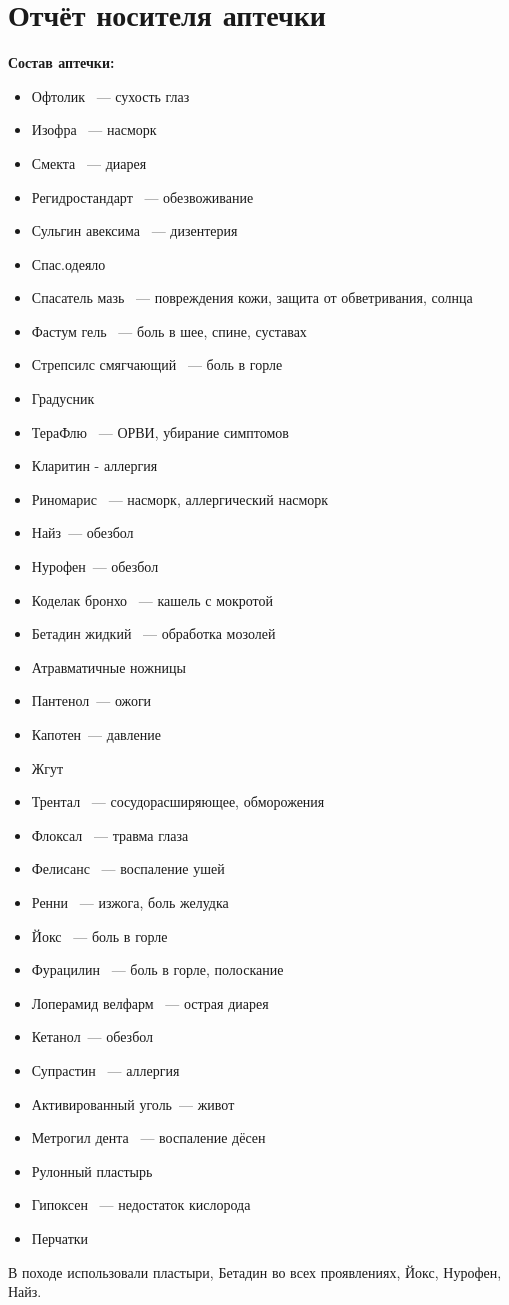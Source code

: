 \section{Отчёт носителя аптечки}

\textbf{Состав аптечки:}

\begin{itemize}
	\item Офтолик ~--- сухость глаз
	\item Изофра ~--- насморк
	\item Смекта ~---  диарея
	\item Регидростандарт ~--- обезвоживание
	\item Сульгин авексима ~--- дизентерия	
	\item Спас.одеяло
	\item Спасатель мазь ~--- повреждения кожи, защита от обветривания, солнца
	\item Фастум гель ~--- боль в шее, спине, суставах
	\item Стрепсилс смягчающий ~--- боль в горле
	\item Градусник
	\item ТераФлю ~--- ОРВИ, убирание симптомов
	\item Кларитин - аллергия
	\item Риномарис ~--- насморк, аллергический насморк
	\item Найз~--- обезбол
	\item Нурофен~--- обезбол
	\item Коделак бронхо ~--- кашель с мокротой
	\item Бетадин жидкий ~--- обработка мозолей
	\item Атравматичные ножницы
	\item Пантенол~--- ожоги
	\item Капотен~--- давление
	\item Жгут
	\item Трентал ~--- сосудорасширяющее, обморожения
	\item Флоксал ~--- травма глаза
	\item Фелисанс ~--- воспаление ушей
	\item Ренни ~--- изжога, боль желудка
	\item Йокс ~--- боль в горле
	\item Фурацилин ~--- боль в горле, полоскание
	\item Лоперамид велфарм ~--- острая диарея
	\item Кетанол~--- обезбол	
	\item Супрастин ~--- аллергия
	\item Активированный уголь~--- живот
	\item Метрогил дента ~--- воспаление дёсен
	\item Рулонный пластырь
	\item Гипоксен ~--- недостаток кислорода
	\item Перчатки
\end{itemize}

В походе использовали пластыри, Бетадин во всех проявлениях, Йокс, Нурофен, Найз.